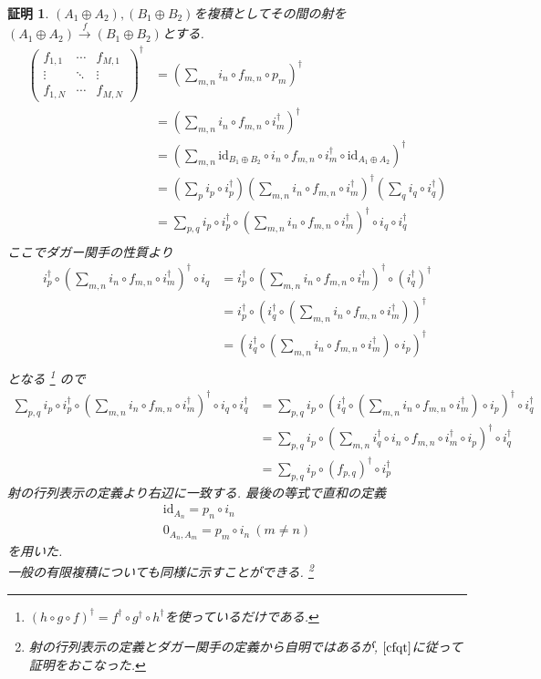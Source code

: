 \documentclass[a4paper,12pt]{ltjsarticle}
\theoremstyle{break}
\newtheorem*{prf}{証明}
\newcommand{\xr}[1]{\xrightarrow{#1}}
\newcommand{\id}{\mathrm{id}}
\newcommand{\ci}{\circ}
\newcommand{\da}{\dagger}
\newcommand{\opl}{\oplus}
\numberwithin{equation}{section}
\begin{document}
\begin{prf}
  $(A_1 \opl A_2), (B_1 \opl B_2)$を複積としてその間の射を$(A_1 \opl A_2) \xr{f} (B_1 \opl B_2)$とする. 
  \begin{align*}
      \begin{pmatrix}
      f_{1,1} & \cdots & f_{M,1} \\
      \vdots & \ddots & \vdots \\
      f_{1,N} & \cdots  & f_{M,N}
      \end{pmatrix}^\da
    &= \left( \sum_{m,n} i_n \ci f_{m,n} \ci p_m \right)^\da \\
    &= \left( \sum_{m,n} i_n \ci f_{m,n} \ci i_m^\da \right)^\da \\
    &= \left( \sum_{m,n} \id_{B_1 \opl B_2} \ci i_n \ci f_{m,n} \ci i_m^\da \ci \id_{A_1 \opl A_2}\right)^\da \\
    &= \left( \sum_p i_p \ci i_p^\da \right) \left( \sum_{m,n} i_n \ci f_{m,n} \ci i_m^\da \right)^\da \left( \sum_q i_q \ci i_q^\da \right) \\
    &= \sum_{p,q} i_p \ci i_p^\da \ci \left( \sum_{m,n} i_n \ci f_{m,n} \ci i_m^\da \right)^\da \ci i_q \ci i_q^\da \\
  \end{align*}
  ここでダガー関手の性質より
  \begin{align*}
    i_p^\da \ci \left( \sum_{m,n} i_n \ci f_{m,n} \ci i_m^\da \right)^\da \ci i_q 
    &= i_p^\da \ci \left( \sum_{m,n} i_n \ci f_{m,n} \ci i_m^\da \right)^\da \ci (i_q^\da)^\da \\
    &= i_p^\da \ci \left( i_q^\da \ci \left( \sum_{m,n} i_n \ci f_{m,n} \ci i_m^\da \right) \right)^\da \\
    &= \left( i_q^\da \ci \left( \sum_{m,n} i_n \ci f_{m,n} \ci i_m^\da \right) \ci i_p \right)^\da \\
  \end{align*}
  となる
  \footnote{
    $(h \ci g \ci f)^\da=f^\da \ci g^\da \ci h^\da$を使っているだけである. 
  }
  ので
  \begin{align*}
    \sum_{p,q} i_p \ci i_p^\da \ci \left( \sum_{m,n} i_n \ci f_{m,n} \ci i_m^\da \right)^\da \ci i_q \ci i_q^\da 
    &= \sum_{p,q} i_p \ci \left( i_q^\da \ci \left( \sum_{m,n} i_n \ci f_{m,n} \ci i_m^\da \right) \ci i_p \right)^\da \ci i_q^\da \\
    &= \sum_{p,q} i_p \ci \left( \sum_{m,n} i_q^\da \ci i_n \ci f_{m,n} \ci i_m^\da \ci i_p \right)^\da \ci i_q^\da \\
    &= \sum_{p,q} i_p \ci (f_{p,q})^\da \ci i_p^\da 
  \end{align*}
  射の行列表示の定義より右辺に一致する. 
  最後の等式で直和の定義
  \begin{align*}
    \id_{A_n}=p_n \ci i_n \\
    0_{A_n,A_m}=p_m \ci i_n~(m \neq n)
  \end{align*}
  を用いた. \\
  一般の有限複積についても同様に示すことができる.
  \footnote{
    射の行列表示の定義とダガー関手の定義から自明ではあるが, $\cite{cfqt}$に従って証明をおこなった. 
  } 
\end{prf}
\end{document}
